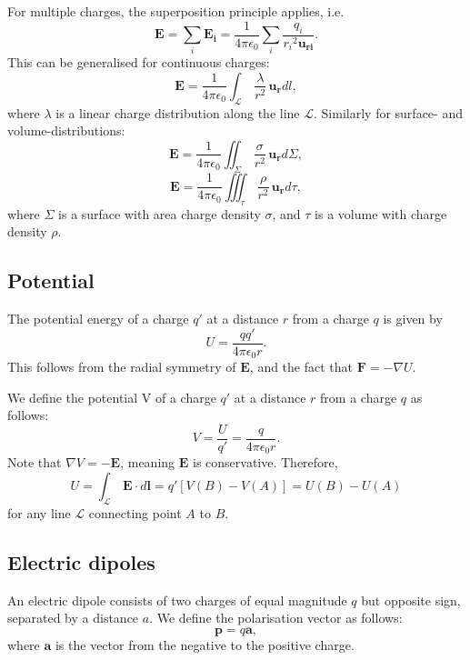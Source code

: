 \documentclass[a4paper, 12pt]{article}
\renewcommand{\vec}[1]{\mathbf{#1}}
\newcommand{\E}{\ensuremath{\vec{E}}}
\newcommand{\e}{\ensuremath{\epsilon_0}}
\begin{document}
    For multiple charges, the superposition principle applies, i.e. 
    \begin{equation}
        \E = \sum_i\vec{E_i} = \frac{1}{4\pi\e}\sum_i\frac{q_i}{{r_i}^2\vec{u_{ri}}}.
    \end{equation}
    This can be generalised for continuous charges: 
    \begin{equation}
        \E = \frac{1}{4\pi\e}\int_\mathcal{L}\,\frac{\lambda}{r^2}\,\vec{u_r}dl,
    \end{equation}
    where $\lambda$ is a linear charge distribution along the line $\mathcal{L}$. Similarly for surface- and volume-distributions: 
    \begin{equation}
        \E = \frac{1}{4\pi\e}\iint_\Sigma\,\frac{\sigma}{r^2}\,\vec{u_r}d\Sigma,
    \end{equation}
    \begin{equation}
        \E = \frac{1}{4\pi\e}\iiint_{\tau}\,\frac{\rho}{r^2}\,\vec{u_r}d\tau,
    \end{equation}
    where $\Sigma$ is a surface with area charge density $\sigma$, and $\tau$ is a volume with charge density $\rho$.
    
\subsection{Potential}
    The potential energy of a charge $q'$ at a distance $r$ from a charge $q$ is given by
    \begin{equation}
        U = \frac{qq'}{4\pi\e r}.
    \end{equation}
    This follows from the radial symmetry of \E, and the fact that $\vec{F} = - \nabla U$.
    
    
    We define the potential V of a charge $q'$ at a distance $r$ from a charge $q$ as follows: 
    \begin{equation}
        V = \frac{U}{q'} = \frac{q}{4\pi\e r}.
    \end{equation}
    Note that $\nabla V = -\E$, meaning $\E$ is conservative. Therefore, 
    \begin{equation}
        U = \int_\mathcal{L}\,\E\cdot d\vec{l} = q'[V(B) - V(A)] = U(B) - U(A)
    \end{equation}
    for any line $\mathcal{L}$ connecting point $A$ to $B$.

\subsection{Electric dipoles}
    An electric dipole consists of two charges of equal magnitude $q$ but opposite sign, separated by a distance $a$. 
    We define the polarisation vector as follows: 
    \begin{equation}
        \vec{p} = q\vec{a},
    \end{equation}
    where $\vec{a}$ is the vector from the negative  to the positive charge. 
    
\end{document}

